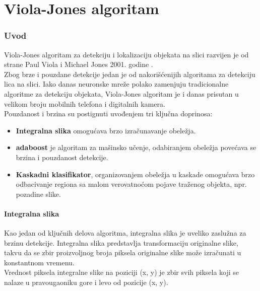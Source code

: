 \part{Viola-Jones algoritam}\label{viola_jones_algorithm}

\section{Uvod} \label{viola_jones_introduction}

Viola-Jones algoritam za detekciju i lokalizaciju objekata na slici razvijen je od
strane Paul Viola i Michael Jones 2001. godine \cite{Viola2001RapidOD}.\\
Zbog brze i pouzdane detekcije jedan je od nakorišćenijih algoritama za
detekciju lica na slici.
Iako danas neuronske mreže polako zamenjuju tradicionalne algoritme za detekciju
objekata, Viola-Jones algoritam je i danas prisutan u velikom broju mobilnih
telefona i digitalnih kamera. \\

Pouzdanost i brzina su postignuti uvođenjem tri ključna doprinosa:
\begin{itemize}
\item \textbf{Integralna slika} omogućava brzo izračunavanje obeležja.
\item \textbf{\gls{adaboost}} je algoritam za mašinsko učenje, odabiranjem
  obeležja povećava se brzina i pouzdanost detekcije.
\item \textbf{Kaskadni klasifikator}, organizovanjem obeležja u kaskade
  omogućava brzo odbacivanje regiona sa malom verovatnoćom pojave traženog
  objekta, npr. pozadine slike. \\
\end{itemize}


\subsection{Integralna slika} \label{ii_sec}

Kao jedan od ključnih delova algoritma, integralna slika je uveliko zaslužna za
brzinu detekcije.
Integralna slika predstavlja transformaciju originalne slike, takvu da se zbir
proizvoljnog broja piksela originalne slike može izračunati u konstantnom
vremenu.\\

Vrednost piksela integralne slike na poziciji (x, y) je zbir svih piksela koji
se nalaze u pravougaoniku gore i levo od pozicije (x, y).

